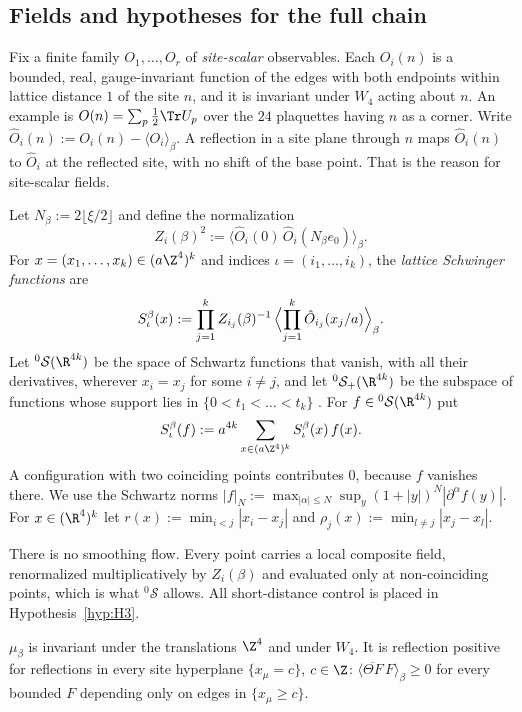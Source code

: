 \subsection{Fields and hypotheses for the full chain}\label{red:S-setting}

Fix a finite family $O_1,\dots,O_r$ of \emph{site-scalar} observables. Each $O_i(n)$ is a bounded, real, gauge-invariant function of the edges with both endpoints within lattice distance $1$ of the site $n$, and it is invariant under $W_4$ acting about $n$. An example is $O(n)=\sum_p\tfrac12\Tr U_p$ over the $24$ plaquettes having $n$ as a corner. Write $\hat O_i(n):=O_i(n)-\langle O_i\rangle_\beta$. A reflection in a site plane through $n$ maps $\hat O_i(n)$ to $\hat O_i$ at the reflected site, with no shift of the base point. That is the reason for site-scalar fields.

Let $N_\beta:=2\lfloor\xi/2\rfloor$ and define the normalization
\[
  Z_i(\beta)^2:=\langle\hat O_i(0)\,\hat O_i(N_\beta e_0)\rangle_\beta .
\]
For $x=(x_1,\dots,x_k)\in(a\Z^4)^k$ and indices $\iota=(i_1,\dots,i_k)$, the \emph{lattice Schwinger functions} are
\begin{equation}\label{red:Sbeta}
  S^\beta_\iota(x):=\prod_{j=1}^k Z_{i_j}(\beta)^{-1}\,\Bigl\langle\prod_{j=1}^k\hat O_{i_j}(x_j/a)\Bigr\rangle_\beta .
\end{equation}
Let ${}^0\mathcal S(\R^{4k})$ be the space of Schwartz functions that vanish, with all their derivatives, wherever $x_i=x_j$ for some $i\ne j$, and let ${}^0\mathcal S_+(\R^{4k})$ be the subspace of functions whose support lies in $\{0<t_1<\dots<t_k\}$ \cite[eq.~(2.25)]{KQR21}. For $f\in{}^0\mathcal S(\R^{4k})$ put
\[
  S^\beta_\iota(f):=a^{4k}\sum_{x\in(a\Z^4)^k}S^\beta_\iota(x)\,f(x).
\]
A configuration with two coinciding points contributes $0$, because $f$ vanishes there. We use the Schwartz norms $|f|_N:=\max_{|\alpha|\le N}\sup_y(1+|y|)^N|\partial^\alpha f(y)|$. For $x\in(\R^4)^k$ let $r(x):=\min_{i<j}|x_i-x_j|$ and $\rho_j(x):=\min_{l\ne j}|x_j-x_l|$.

There is no smoothing flow. Every point carries a local composite field, renormalized multiplicatively by $Z_i(\beta)$ and evaluated only at non-coinciding points, which is what ${}^0\mathcal S$ allows. All short-distance control is placed in Hypothesis~\ref{hyp:H3}.

\begin{hypothesis}\label{hyp:H0}
$\mu_\beta$ is invariant under the translations $\Z^4$ and under $W_4$. It is reflection positive for reflections in every site hyperplane $\{x_\mu=c\}$, $c\in\Z$: $\langle\overline{\Theta F}\,F\rangle_\beta\ge0$ for every bounded $F$ depending only on edges in $\{x_\mu\ge c\}$.
\end{hypothesis}

